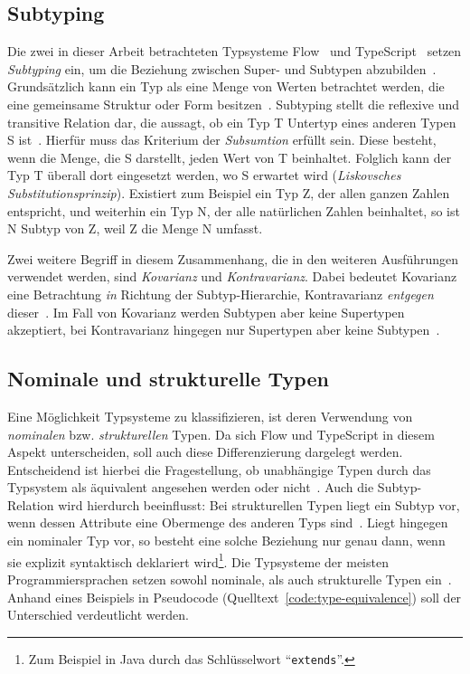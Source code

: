 \subsection{Subtyping}

Die zwei in dieser Arbeit betrachteten Typsysteme Flow~\autocite{FLOW:PAPER} und TypeScript~\autocite{TYPESCRIPT:SPEC} setzen \textit{Subtyping} ein, um die Beziehung zwischen Super- und Subtypen abzubilden~\autocites{FLOW:PAPER,BIERMAN:2014}. Grundsätzlich kann ein Typ als eine Menge von Werten betrachtet werden, die eine gemeinsame Struktur oder Form besitzen~\autocite[3]{AMADIO:1993}. Subtyping stellt die reflexive und transitive Relation dar, die aussagt, ob ein Typ T Untertyp eines anderen Typen S ist~\autocite[27\psq]{CARDELLI:TYPE_SYSTEMS}. Hierfür muss das Kriterium der \emph{Subsumtion} erfüllt sein. Diese besteht, wenn die Menge, die S darstellt, jeden Wert von T beinhaltet. Folglich kann der Typ T überall dort eingesetzt werden, wo S erwartet wird (\textit{Liskovsches Substitutionsprinzip}). Existiert zum Beispiel ein Typ Z, der allen ganzen Zahlen entspricht, und weiterhin ein Typ N, der alle natürlichen Zahlen beinhaltet, so ist N Subtyp von Z, weil Z die Menge N umfasst.

Zwei weitere Begriff in diesem Zusammenhang, die in den weiteren Ausführungen verwendet werden, sind \emph{Kovarianz} und \emph{Kontravarianz}. Dabei bedeutet Kovarianz eine Betrachtung \emph{in} Richtung der Subtyp-Hierarchie, Kontravarianz \emph{entgegen} dieser~\autocite{VARIANCE}. Im Fall von Kovarianz werden Subtypen aber keine Supertypen akzeptiert, bei Kontravarianz hingegen nur Supertypen aber keine Subtypen~\autocite{FLOW:VARIANCE}.

\subsection{Nominale und strukturelle Typen}
Eine Möglichkeit Typsysteme zu klassifizieren, ist deren Verwendung von \textit{nominalen} bzw. \textit{strukturellen} Typen. Da sich Flow und TypeScript in diesem Aspekt unterscheiden, soll auch diese Differenzierung dargelegt werden. Entscheidend ist hierbei die Fragestellung, ob unabhängige Typen durch das Typsystem als äquivalent angesehen werden oder nicht~\autocite[9]{CARDELLI:TYPE_SYSTEMS}. Auch die Subtyp-Relation wird hierdurch beeinflusst: Bei strukturellen Typen liegt ein Subtyp vor, wenn dessen Attribute eine Obermenge des anderen Typs sind~\autocite{MALAYERI:2008}. Liegt hingegen ein nominaler Typ vor, so besteht eine solche Beziehung nur genau dann, wenn sie explizit syntaktisch deklariert wird\footnote{Zum Beispiel in Java durch das Schlüsselwort \enquote{\texttt{extends}}.}. Die Typsysteme der meisten Programmiersprachen setzen sowohl nominale, als auch strukturelle Typen ein~\autocite[9]{CARDELLI:TYPE_SYSTEMS}. Anhand eines Beispiels in Pseudocode (Quelltext~\ref{code:type-equivalence}) soll der Unterschied verdeutlicht werden.

